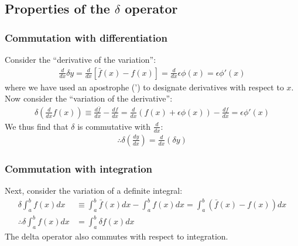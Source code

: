 \subsection{Properties of the $\delta$ operator}
\subsubsection{Commutation with differentiation}
Consider the ``derivative of the variation'':
\begin{align}
\frac{d}{dx}\delta y =\frac{d}{dx} \left[\bar{f}(x)-f(x) \right]=\frac{d}{dx} \epsilon \phi(x)=\epsilon \phi'(x)
\end{align}
where we have used an apostrophe (') to designate derivatives with respect to $x$. Now consider the ``variation of the derivative'':
\begin{align}
\delta \left(\frac{d}{dx}f(x)\right) \equiv \frac{d\bar{f}}{dx}-\frac{df}{dx} = \frac{d}{dx} (f(x)+\epsilon \phi(x)) - \frac{df}{dx} = \epsilon \phi'(x)
\end{align}
We thus find that $\delta$ is commutative with $\frac{d}{dx}$:
\begin{align}
\label{eqn:vardiffcommut}
\therefore \delta \left(\frac{dy}{dx}\right) = \frac{d}{dx}\left(\delta y\right)
\end{align}
\subsubsection{Commutation with integration}
Next, consider the variation of a definite integral:
\begin{align}
\delta \int_a^b f(x) dx &\equiv  \int_a^b \bar{f}(x) dx - \int_a^b f(x) dx = \int_a^b (\bar{f}(x)-f(x)) dx\nonumber\\
\therefore \delta \int_a^b f(x) dx &= \int_a^b \delta f(x) dx 
\end{align}
The delta operator also commutes with respect to integration.

